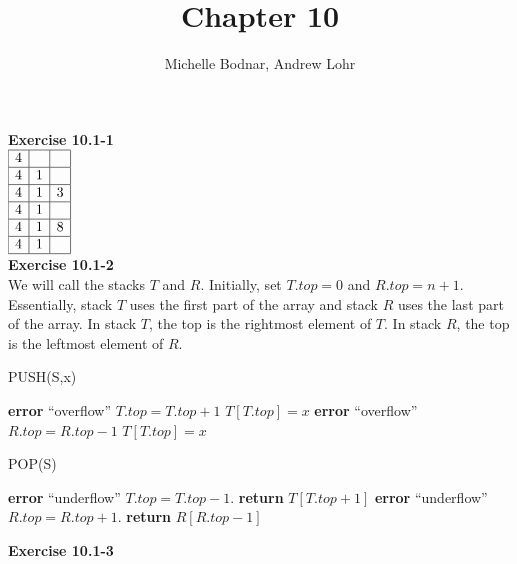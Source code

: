 \documentclass{article}
\title{Chapter 10}
\author{Michelle Bodnar, Andrew Lohr}
\begin{document}
\maketitle

\noindent\textbf{ Exercise 10.1-1} \\

$
\begin{array}{|c|c|c|}
\hline
4&&\\
\hline
4&1&\\
\hline
4&1&3\\
\hline
4&1&\\
\hline
4&1&8\\
\hline
4&1&\\
\hline
\end{array}
$\\

\noindent\textbf{Exercise 10.1-2}\\

We will call the stacks $T$ and $R$. Initially, set $T.top = 0$ and $R.top = n+1$.  Essentially, stack $T$ uses the first part of the array and stack $R$ uses the last part of the array.  In stack $T$, the top is the rightmost element of $T$.  In stack $R$, the top is the leftmost element of $R$. 
\begin{algorithm}
\caption{PUSH(S,x)}
\begin{algorithmic}[1]
		\State \textbf{error} ``overflow''
	\Else
		\State $T.top = T.top + 1$
		\State $T[T.top] = x$
	\EndIf
\EndIf
{}
		\State \textbf{error} ``overflow''
	\Else
		\State $R.top = R.top - 1$
		\State $T[T.top] = x$
	\EndIf
\EndIf
\end{algorithmic}
\end{algorithm}

\begin{algorithm}
\caption{POP(S)}
\begin{algorithmic}
		\State \textbf{error} ``underflow''
	\Else
		\State $T.top = T.top - 1$. 
		\State \textbf{return} $T[T.top + 1]$
	\EndIf
\EndIf
{}
		\State \textbf{error} ``underflow''
	\Else
		\State $R.top = R.top + 1$. 
		\State \textbf{return} $R[R.top - 1]$
	\EndIf
\EndIf
\end{algorithmic}
\end{algorithm}


\noindent\textbf{ Exercise 10.1-3} \\
\end{document}
